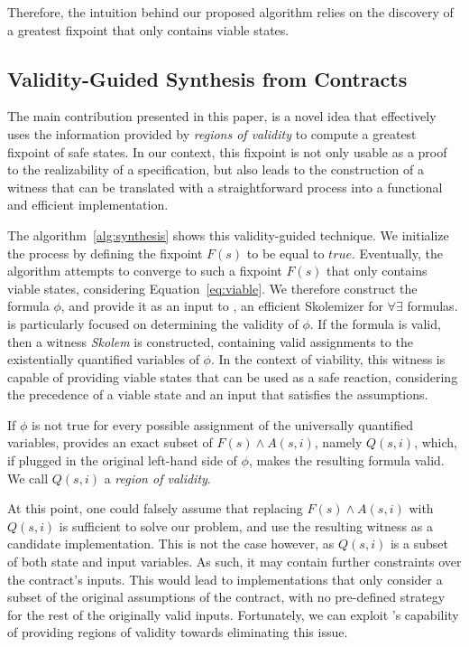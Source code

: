 Therefore, the intuition behind our proposed algorithm relies on the discovery
of a greatest fixpoint that only contains viable states.


\subsection{Validity-Guided Synthesis from Contracts}
\label{sec:synth}

The main contribution presented in this paper, is a novel idea that effectively
uses the information provided by \textit{regions of validity} to compute a
greatest fixpoint of safe states. In our context, this fixpoint is not only
usable as a proof to the realizability of a specification, but also leads to the
construction of a witness that can be translated with a straightforward process
into a functional and efficient implementation.

The algorithm~\ref{alg:synthesis} shows this validity-guided technique.
We initialize the process by defining the fixpoint $F(s)$ to be equal to $true$.
Eventually, the algorithm attempts to converge to such a fixpoint $F(s)$ that
only contains viable states, considering Equation~\ref{eq:viable}. We therefore
construct the formula $\phi$, and provide it as an input to \aeval, an efficient
Skolemizer for $\forall\exists$ formulas. \aeval is particularly focused on
determining the validity of $\phi$. If the formula is valid, then a witness
\textit{Skolem} is constructed, containing valid assignments to the
existentially quantified variables of $\phi$. In the context of viability, this
witness is capable of providing viable states that can be used as a safe
reaction, considering the precedence of a viable state and an input that
satisfies the assumptions.

If $\phi$ is not true for every possible assignment of the universally
quantified variables, \aeval provides an exact subset of $F(s) \land A(s,i)$, namely
$Q(s,i)$, which, if plugged in the original left-hand side of $\phi$, makes the
resulting formula valid. We call $Q(s,i)$ a \textit{region of validity}.

At this point, one could falsely assume that replacing $F(s) \land A(s,i)$ with
$Q(s,i)$ is sufficient to solve our problem, and use the resulting witness as a
candidate implementation. This is not the case however, as $Q(s,i)$ is a subset
of both state and input variables. As such, it may contain further constraints
over the contract's inputs. This would lead to implementations that only
consider a subset of the original assumptions of the contract, with no
pre-defined strategy for the rest of the originally valid inputs.
Fortunately, we can exploit \aeval's capability of providing regions of validity
towards eliminating this issue.

